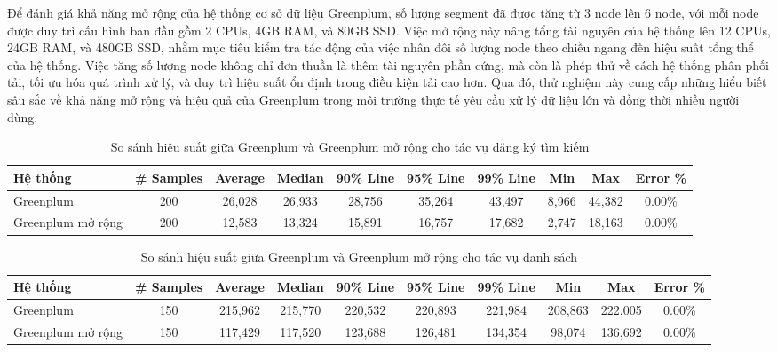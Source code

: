 Để đánh giá khả năng mở rộng của hệ thống cơ sở dữ liệu Greenplum, số lượng segment đã được tăng từ 3 node lên 6 node, với mỗi node được duy trì cấu hình ban đầu gồm 2 CPUs, 4GB RAM, và 80GB SSD. Việc mở rộng này nâng tổng tài nguyên của hệ thống lên 12 CPUs, 24GB RAM, và 480GB SSD, nhằm mục tiêu kiểm tra tác động của việc nhân đôi số lượng node theo chiều ngang đến hiệu suất tổng thể của hệ thống. Việc tăng số lượng node không chỉ đơn thuần là thêm tài nguyên phần cứng, mà còn là phép thử về cách hệ thống phân phối tải, tối ưu hóa quá trình xử lý, và duy trì hiệu suất ổn định trong điều kiện tải cao hơn. Qua đó, thử nghiệm này cung cấp những hiểu biết sâu sắc về khả năng mở rộng và hiệu quả của Greenplum trong môi trường thực tế yêu cầu xử lý dữ liệu lớn và đồng thời nhiều người dùng.

\begin{table}[htbp]
\centering
\renewcommand{\arraystretch}{1.2} %
\setlength{\tabcolsep}{2pt} %
\begin{tabular}{|l|c|c|c|c|c|c|c|c|c|}
\hline
\textbf{Hệ thống} & \textbf{\# Samples} & \textbf{Average} & \textbf{Median} & \textbf{90\% Line} & \textbf{95\% Line} & \textbf{99\% Line} & \textbf{Min} & \textbf{Max} & \textbf{Error \%} \\ \hline
Greenplum & 200 & 26,028 & 26,933 & 28,756 & 35,264 & 43,497 & 8,966 & 44,382 & 0.00\% \\ \hline
Greenplum mở rộng & 200 & 12,583 & 13,324 & 15,891 & 16,757 & 17,682 & 2,747 & 18,163 & 0.00\% \\ \hline
\end{tabular}
\caption{So sánh hiệu suất giữa Greenplum và Greenplum mở rộng cho tác vụ dăng ký tìm kiếm}
\label{tab:Greenplum_extended_comparison_search}
\end{table}

\begin{table}[htbp]
\centering
\renewcommand{\arraystretch}{1.2} %
\setlength{\tabcolsep}{1.5pt} %
\begin{tabular}{|l|c|c|c|c|c|c|c|c|c|}
\hline
\textbf{Hệ thống} & \textbf{\# Samples} & \textbf{Average} & \textbf{Median} & \textbf{90\% Line} & \textbf{95\% Line} & \textbf{99\% Line} & \textbf{Min} & \textbf{Max} & \textbf{Error \%} \\ \hline
Greenplum & 150 & 215,962 & 215,770 & 220,532 & 220,893 & 221,984 & 208,863 & 222,005 & 0.00\% \\ \hline
Greenplum mở rộng & 150 & 117,429 & 117,520 & 123,688 & 126,481 & 134,354 & 98,074 & 136,692 & 0.00\% \\ \hline
\end{tabular}
\caption{So sánh hiệu suất giữa Greenplum và Greenplum mở rộng cho tác vụ danh sách}
\label{tab:Greenplum_extended_comparison_list}
\end{table}

